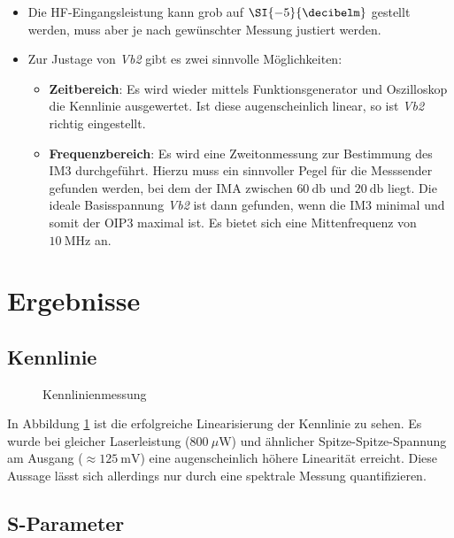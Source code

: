 \begin{itemize}
\begin{itemize}
\end{itemize}
\item Die \ac{HF}-Eingangsleistung kann grob auf $\SI{-5}{\decibelm}$ gestellt werden, muss aber je nach gewünschter Messung justiert werden.
\item Zur Justage von \textit{Vb2} gibt es zwei sinnvolle Möglichkeiten:
\begin{itemize}
\item \textbf{Zeitbereich}: Es wird wieder mittels Funktionsgenerator und Oszilloskop die Kennlinie ausgewertet. Ist diese augenscheinlich linear, so ist \textit{Vb2} richtig eingestellt.
\item \textbf{Frequenzbereich}: Es wird eine Zweitonmessung zur Bestimmung des \ac{IM3} durchgeführt. Hierzu muss ein sinnvoller Pegel für die Messsender gefunden werden, bei dem der \ac{IMA} zwischen $\SI{60}{\decibel}$ und $\SI{20}{\decibel}$ liegt. Die ideale Basisspannung \textit{Vb2} ist dann gefunden, wenn die \ac{IM3} minimal und somit der \ac{OIP3} maximal ist. Es bietet sich eine Mittenfrequenz von $\SI{10}{\mega\hertz}$ an.
\end{itemize}
\end{itemize}

\section{Ergebnisse}
\subsection{Kennlinie}
\begin{figure}[H]
\raggedright
\raggedleft
\caption{Kennlinienmessung} 
\label{img:kenn}
\end{figure}

In Abbildung \ref{img:kenn} ist die erfolgreiche Linearisierung der Kennlinie zu sehen. Es wurde bei gleicher Laserleistung ($\SI{800}{\mu\watt}$) und ähnlicher Spitze-Spitze-Spannung am Ausgang ($\approx\SI{125}{\milli\volt}$) eine augenscheinlich höhere Linearität erreicht. Diese Aussage lässt sich allerdings nur durch eine spektrale Messung quantifizieren.

\subsection{S-Parameter}

